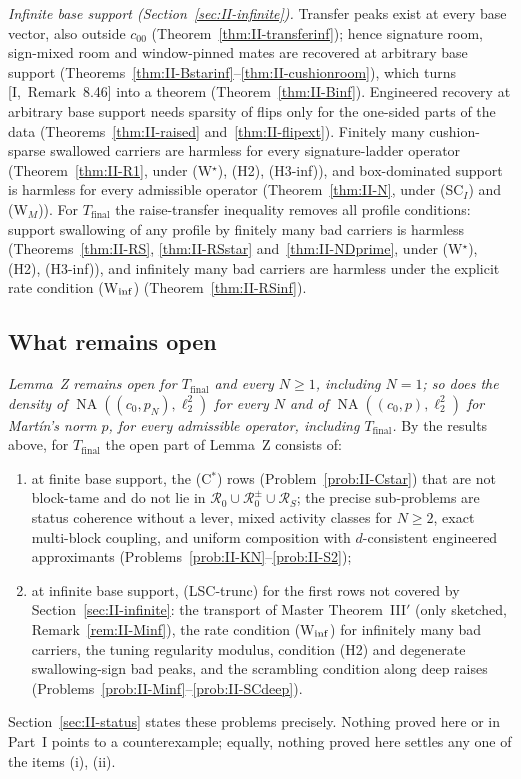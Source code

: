 \documentclass[10pt]{amsart}
\theoremstyle{definition}
\theoremstyle{remark}
\newcommand{\NA}{\operatorname{NA}}
\begin{document}
\emph{Infinite base support (Section~\ref{sec:II-infinite}).}  Transfer
peaks exist at every base vector, also outside $c_{00}$
(Theorem~\ref{thm:II-transferinf}); hence signature room, sign-mixed
room and window-pinned mates are recovered at arbitrary base support
(Theorems~\ref{thm:II-Bstarinf}--\ref{thm:II-cushionroom}), which turns
[I,~Remark~8.46] into a theorem (Theorem~\ref{thm:II-Binf}).  Engineered
recovery at arbitrary base support needs sparsity of flips only for the
one-sided parts of the data (Theorems~\ref{thm:II-raised}
and~\ref{thm:II-flipext}).  Finitely many cushion-sparse swallowed carriers
are harmless for every signature-ladder operator (Theorem~\ref{thm:II-R1},
under (W$^\star$), (H2), (H3-inf)),
and box-dominated support is harmless for every admissible operator
(Theorem~\ref{thm:II-N}, under (SC$_I$) and (W$_M$)).  For
$T_{\mathrm{final}}$ the raise-transfer
inequality removes all profile conditions: support swallowing of any
profile by finitely many bad carriers is harmless
(Theorems~\ref{thm:II-RS}, \ref{thm:II-RSstar} and~\ref{thm:II-NDprime},
under (W$^\star$), (H2), (H3-inf)),
and infinitely many bad carriers are harmless under the explicit rate
condition (W$_{\rm inf}$) (Theorem~\ref{thm:II-RSinf}).

\subsection{What remains open}
\emph{Lemma~Z remains open for $T_{\mathrm{final}}$ and every $N\ge1$,
including $N=1$; so does the density of $\NA((c_0,p_N),\ell_2^2)$ for every
$N$ and of $\NA((c_0,p),\ell_2^2)$ for Mart\'in's norm $p$, for every
admissible operator, including $T_{\mathrm{final}}$.}  By the results above,
for $T_{\mathrm{final}}$ the open part of Lemma~Z consists of:
\begin{enumerate}
\item[(i)] at finite base support, the (C$^*$) rows
(Problem~\ref{prob:II-Cstar}) that are not block-tame and do not lie in
$\mathcal R_0\cup\mathcal R_0^\pm\cup\mathcal R_S$; the precise
sub-problems are status coherence without a lever, mixed activity classes
for $N\ge2$, exact multi-block coupling, and uniform composition with
$d$-consistent engineered approximants (Problems~\ref{prob:II-KN}--\ref{prob:II-S2});
\item[(ii)] at infinite base support, (LSC-trunc) for the first rows not
covered by Section~\ref{sec:II-infinite}: the transport of Master
Theorem~III$'$ (only sketched, Remark~\ref{rem:II-Minf}), the rate
condition (W$_{\rm inf}$) for infinitely many bad carriers, the tuning
regularity modulus, condition (H2) and degenerate swallowing-sign bad
peaks, and the scrambling condition along deep raises
(Problems~\ref{prob:II-Minf}--\ref{prob:II-SCdeep}).
\end{enumerate}
Section~\ref{sec:II-status} states these problems precisely.  Nothing
proved here or in Part~I points to a counterexample; equally, nothing
proved here settles any one of the items (i), (ii).
\end{document}

